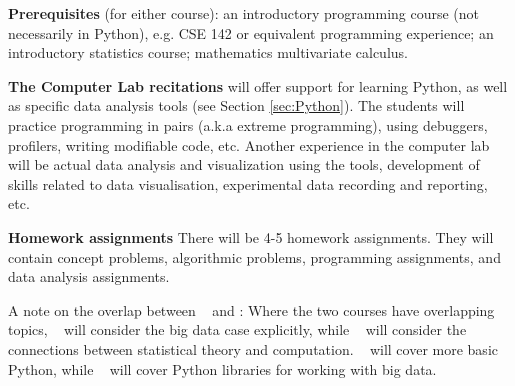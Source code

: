 {\bf Prerequisites} (for either course): an introductory programming
course (not necessarily in Python), e.g. CSE 142 or equivalent
programming experience; an introductory statistics course; mathematics
multivariate calculus. 



{\bf The Computer Lab recitations} will offer support for learning
Python, as well as specific data analysis tools (see Section \ref{sec:Python}).
The students will practice programming in pairs (a.k.a extreme
programming), using debuggers, profilers, writing modifiable code, etc.
Another experience in the computer lab will be actual data analysis
and visualization using the tools, development of skills related to data
visualisation, experimental data recording and reporting, etc.

{\bf Homework assignments} There will be 4-5 homework
assignments. They will contain concept problems, algorithmic problems,
programming assignments, and data analysis assignments.

A note on the overlap between \statcl~ and \astrocl: Where the two
courses have overlapping topics, \astrocl~ will consider the big data case
explicitly, while \statcl~ will consider the connections between
statistical theory and computation. \statcl~ will cover more basic
Python, while \astrocl~ will cover Python libraries for working with big data.


